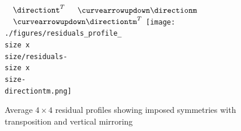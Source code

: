 \documentclass[11pt,a4paper,openright,twoside]{book}
\numberwithin{equation}{section} %
\numberwithin{figure}{section} %
\numberwithin{table}{section} %
\begin{document}
\begin{figure}[tb]
\begin{minipage}{0.6\textwidth}
{		%
		$\quad\directiont^T$
		$\quad\curvearrowupdown\directionm$
		$\quad\curvearrowupdown\directiontm^T$ %
		\texttt{[image: ./figures/residuals\_profile\_\\size x\\size/residuals-\\size x\\size-\\directiontm.png]}
		\par
}
\end{minipage}
	\caption[Average $4\times4$ residual profiles showing imposed symmetries]
	{Average $4\times4$ residual profiles showing imposed symmetries with
	transposition and vertical mirroring}
	\label{fig:symmetry_transposed_mirror_4}
\end{figure}
\end{document}
